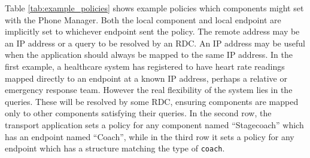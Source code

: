 \documentclass[12pt,twoside,notitlepage]{report}
\begin{document}
Table \ref{tab:example_policies} shows example policies which components might set with the Phone Manager. 
Both the local component and local endpoint are implicitly set to whichever endpoint sent the policy. 
The remote address may be an IP address or a query to be resolved by an RDC. 
An IP address may be useful when the application should always be mapped to the same IP address. 
In the first example, a healthcare system has registered to have heart rate readings mapped directly to an endpoint at a known IP address, perhaps a relative or emergency response team. 
However the real flexibility of the system lies in the queries. 
These will be resolved by some RDC, ensuring components are mapped only to other components satisfying their queries. 
In the second row, the transport application sets a policy for any component named ``Stagecoach'' which has an endpoint named ``Coach'', while in the third row it sets a policy for any endpoint which has a structure matching the type of {\tt coach}. 
\end{document}
